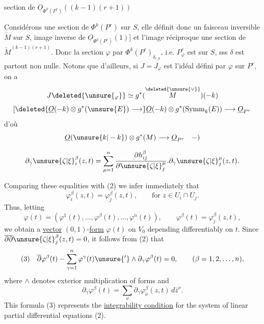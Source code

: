 section de $\underline O_{\Phi^k(P^r)}((k-1)(r+1))$

Considérons une section \inserted{$\varphi$} de $\Phi^k(P^r)$ sur $S$, elle
définit donc un 
faisceau inversible $\check M$ sur $S$, image inverse
de $\underline O_{\Phi^k(P^r)}(1)$] et
l'image réciproque une section \inserted{$\delta$} de
$\check M^{(k-1)(r+1)}$.
Donc la section $\varphi$ 
par $\Phi^k(P^r)_{\delta_{r,k}}$, i.e. $P^r_\varphi$ est  sur $S$,
sss $\delta$ est partout non nulle. Notons que
d'ailleurs, si $J=J_\varphi$ est l'idéal défini par $\varphi$
sur $P^r$, on a
\[
J\deleted{\unsure{_\varphi}}\simeq g^*(\overset{\deleted{\unsure{\vee}}}{M})(-k)
\]
\[
\left[
\deleted{\underline O(-k)\otimes g^*(\unsure{E})\longrightarrow}
\underline O(-k)\otimes g^*(\operatorname{Symm}_k(E))\longrightarrow\underline O_{P^r}
\right.
\]
d'où
\[
\underline O(\unsure{k|-k})\otimes g^*(M)\longrightarrow\underline O_{P^r}\quad-)
\]



\[
\partial_\gamma\unsure{\zeta|\xi}_i^\beta(z,t)
=\sum_{\mu=1}^n\frac{\partial h_{ij}^\beta}{\partial\unsure{\zeta|\xi}_j^\mu}
.\partial_\gamma\unsure{\zeta|\xi}_j^\mu(z,t).
\]

Comparing these equalities with (2) we infer immediately that
\[
\varphi_i^\beta(z,t)=\varphi_j^\beta(z,t),\qquad\text{for }z\in U_i\cap U_j.
\]
Thus, letting
\[
\varphi(t)=(\varphi^1(t),\ldots,\varphi^\beta(t),\ldots,\varphi^n(t)),
\qquad\varphi^\beta(t)=\varphi_j^\beta(z,t),
\]
we obtain a \uline{vector} $(0,1)$-\uline{form} $\varphi(t)$ on $V_0$ depending
differentiably on $t$. Since $\overline\partial\overline\partial\unsure{\zeta|\xi}_j^\beta(z,t)=0$, it follows from
(2) that
\[
(3)\quad\overline\partial\varphi^\beta(t)
-\sum_{\gamma=1}^n\varphi^\gamma(t)\unsure{'}\wedge\partial_\gamma\varphi^\beta(t)=0,
\qquad(\beta=1,2,\ldots,n),
\]
where $\wedge$ denotes exterior multiplication of forms and
\[
\partial_\gamma\varphi^\beta(t)=\sum_\nu\partial_\gamma\varphi_{\bar\nu}^\beta(z,t)\,d\bar z^\nu.
\]
This formula (3) represents the \uline{integrability condition} for the
system of linear partial differential equations (2).

